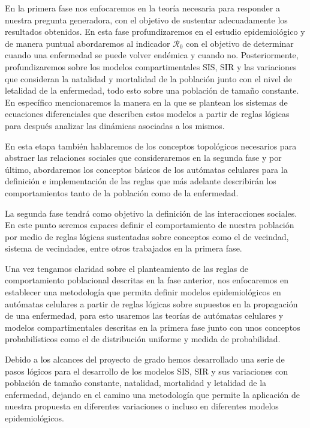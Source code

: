 En la primera fase nos enfocaremos en la teoría necesaria para responder a nuestra pregunta generadora, con el objetivo de sustentar adecuadamente los resultados obtenidos. En esta fase profundizaremos en el estudio epidemiológico y de manera puntual abordaremos al indicador $\mathcal{R}_0$ con el objetivo de determinar cuando una enfermedad se puede volver endémica y cuando no. Posteriormente, profundizaremos sobre los modelos compartimentales SIS, SIR y las variaciones que consideran la natalidad y mortalidad de la población junto con el nivel de letalidad de la enfermedad, todo esto sobre una población de tamaño constante. En específico mencionaremos la manera en la que se plantean los sistemas de ecuaciones diferenciales que describen estos modelos a partir de reglas lógicas para después analizar las dinámicas asociadas a los mismos.

En esta etapa también hablaremos de los conceptos topológicos necesarios para abstraer las relaciones sociales que consideraremos en la segunda fase y por último, abordaremos los conceptos básicos de los autómatas celulares para la definición e implementación de las reglas que más adelante describirán los comportamientos tanto de la población como de la enfermedad.
    
La segunda fase tendrá como objetivo la definición de las interacciones sociales. En este punto seremos capaces definir el comportamiento de nuestra población por medio de reglas lógicas sustentadas sobre conceptos como el de vecindad, sistema de vecindades, entre otros trabajados en la primera fase.
    
Una vez tengamos claridad sobre el planteamiento de las reglas de comportamiento poblacional descritas en la fase anterior, nos enfocaremos en establecer una metodología que permita definir modelos epidemiológicos en autómatas celulares a partir de reglas lógicas sobre supuestos en la propagación de una enfermedad, para esto usaremos las teorías de autómatas celulares y modelos compartimentales descritas en la primera fase junto con unos conceptos probabilísticos como el de distribución uniforme y medida de probabilidad. 
    
Debido a los alcances del proyecto de grado hemos desarrollado una serie de pasos lógicos para el desarrollo de los modelos SIS, SIR y sus variaciones con población de tamaño constante, natalidad, mortalidad y letalidad de la enfermedad, dejando en el camino una metodología que permite la aplicación de nuestra propuesta en diferentes variaciones o incluso en diferentes modelos epidemiológicos.
    
